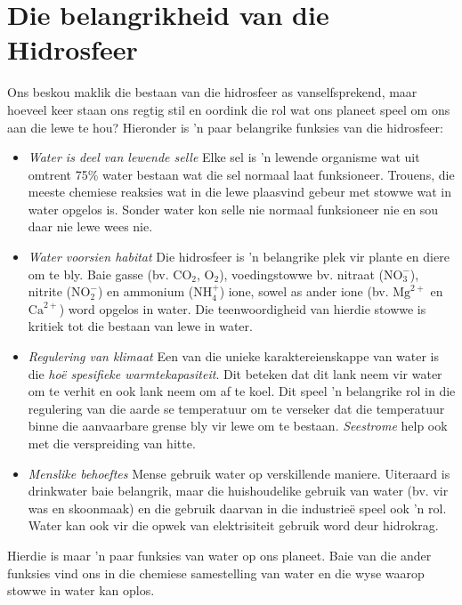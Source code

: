 \section{Die belangrikheid van die Hidrosfeer}
            \nopagebreak

      \label{m38138*id335077}Ons beskou maklik die bestaan van die hidrosfeer as vanselfsprekend, maar hoeveel keer staan ons regtig stil en oordink die rol wat ons planeet speel om ons aan die lewe te hou? Hieronder is   'n paar belangrike funksies van die hidrosfeer:
      \label{m38138*id335082}\begin{itemize}[noitemsep]
            \label{m38138*uid15}\item \textsl{Water is deel van lewende selle}
Elke sel is   'n lewende organisme wat uit omtrent 75\% water bestaan wat die sel normaal laat funksioneer. Trouens, die meeste chemiese reaksies wat in die lewe plaasvind gebeur met stowwe wat in water opgelos is. Sonder water kon selle nie normaal funksioneer nie en sou daar nie lewe wees nie.
\label{m38138*uid16}\item \textsl{Water voorsien habitat}
Die hidrosfeer is   'n belangrike plek vir plante en diere om te bly. Baie gasse (bv. ${\text{CO}}_{2}$, ${\text{O}}_{2}$), voedingstowwe bv. nitraat ($\text{NO}_{3}^{-}$), nitrite ($\text{NO}_{2}^{-}$) en ammonium ($\text{NH}_{4}^{+}$) ione, sowel as ander ione (bv. ${\text{Mg}}^{2+}$ en ${\text{Ca}}^{2+}$) word opgelos in water. Die teenwoordigheid van hierdie stowwe is kritiek tot die bestaan van lewe in water.
\label{m38138*uid17}\item \textsl{Regulering van klimaat}
Een van die unieke karaktereienskappe van water is die \textsl{ho\"{e} spesifieke warmtekapasiteit}. Dit beteken dat dit lank neem vir water om te verhit en ook lank neem om af te koel. Dit speel   'n belangrike rol in die regulering van die aarde se temperatuur om te verseker dat die temperatuur binne die aanvaarbare grense bly vir lewe om te bestaan. \textsl{Seestrome} help ook met die verspreiding van hitte.
\label{m38138*uid18}\item \textsl{Menslike behoeftes}
Mense gebruik water op verskillende maniere. Uiteraard is drinkwater baie belangrik, maar die huishoudelike gebruik van water (bv. vir was en skoonmaak) en die gebruik daarvan in die industrie\"{e} speel ook   'n rol. Water kan ook vir die opwek van elektrisiteit gebruik word deur hidrokrag.
\end{itemize}
Hierdie is maar   'n paar funksies van water op ons planeet. Baie van die ander funksies vind ons in die chemiese samestelling van water en die wyse waarop stowwe in water kan oplos.


